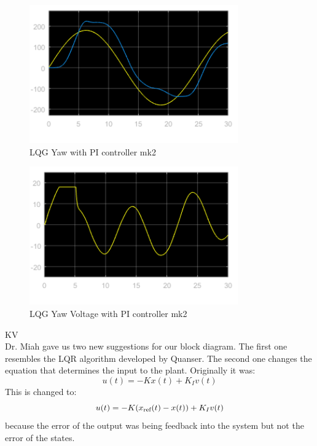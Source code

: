\documentclass[fontsize=11pt, %
                             paper=letter, %
                             openany, %
                             captions=tableheading,
                             index=totoc,
                             hyperref]{labbook}
\begin{document}
\begin{addmargin}[0cm]{0cm}
\begin{figure}[H]
  \centering
  \includegraphics[width=0.8\textwidth]{figs/img/02192019/LQGYawmk2.png}
  \caption{LQG Yaw with PI controller mk2}
  \label{fig:LQG_PI_Yawmk2}
\end{figure}

\begin{figure}[H]
  \centering
  \includegraphics[width=0.8\textwidth]{figs/img/02192019/LQGYawVoltmk2.png}
  \caption{LQG Yaw Voltage with PI controller mk2}
  \label{fig:LQG_PI_YawVoltmk2}
\end{figure}

KV\\
Dr. Miah gave us two new suggestions for our block diagram.  The first one resembles the LQR algorithm developed by Quanser.  The second one changes the equation that determines the input to the plant.  Originally it was: \begin{equation}
    u(t) = -Kx(t) + K_Iv(t)
\end{equation}
This is changed to:
\begin{equation}
    u(t) = -K(x\textsubscript{ref}(t)-x(t)) + K_Iv(t)
\end{equation}
because the error of the output was being feedback into the system but not the error of the states.


\end{addmargin}
\end{document}
